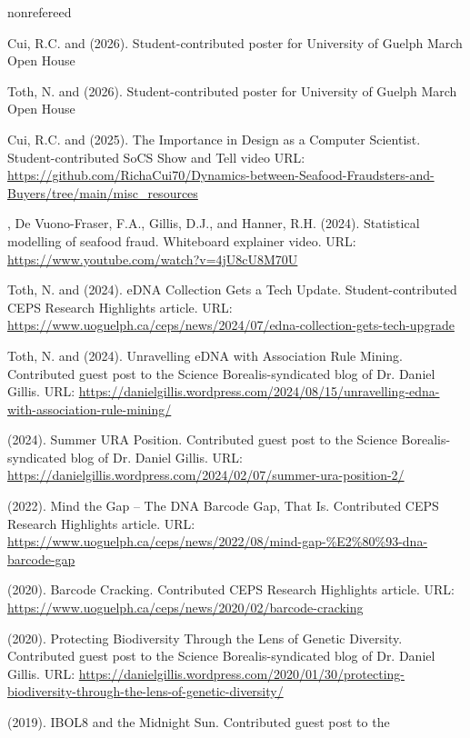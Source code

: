 \medskip
\begin{revlist}[itemsep=0.45\baselineskip]{nonrefereed}
\item \dsup Cui, R.C. and \me (2026). Student-contributed poster for University of
  Guelph March Open House
\item \dsup Toth, N. and \me (2026). Student-contributed poster for University of
  Guelph March Open House
\item \dsup Cui, R.C. and \me (2025). The Importance in Design as a Computer
  Scientist. Student-contributed SoCS Show and Tell video URL:
  \url{https://github.com/RichaCui70/Dynamics-between-Seafood-Fraudsters-and-Buyers/tree/main/misc_resources}
\item \me, \dsup De Vuono-Fraser, F.A., Gillis, D.J., and Hanner, R.H. (2024).
  Statistical modelling of seafood fraud. Whiteboard explainer video. URL:
  \url{https://www.youtube.com/watch?v=4jU8cU8M70U}
\item \dsup Toth, N. and \me (2024). eDNA Collection Gets a Tech Update.
  Student-contributed CEPS Research Highlights article. URL:
  \url{https://www.uoguelph.ca/ceps/news/2024/07/edna-collection-gets-tech-upgrade}
\item \dsup Toth, N. and \me (2024). Unravelling eDNA with Association Rule
  Mining. Contributed guest post to the Science Borealis-syndicated blog of
  Dr. Daniel Gillis. URL:
  \url{https://danielgillis.wordpress.com/2024/08/15/unravelling-edna-with-association-rule-mining/}
\item \me (2024). Summer URA Position. Contributed guest post to the Science
  Borealis-syndicated blog of Dr. Daniel Gillis. URL:
  \url{https://danielgillis.wordpress.com/2024/02/07/summer-ura-position-2/}
\item \me (2022). Mind the Gap -- The DNA Barcode Gap, That Is. Contributed CEPS
  Research Highlights article. URL:
  \url{https://www.uoguelph.ca/ceps/news/2022/08/mind-gap-%E2%80%93-dna-barcode-gap}
\item \me (2020). Barcode Cracking. Contributed CEPS Research Highlights
  article. URL: \url{https://www.uoguelph.ca/ceps/news/2020/02/barcode-cracking}
\item \me (2020). Protecting Biodiversity Through the Lens of Genetic Diversity.
  Contributed guest post to the Science Borealis-syndicated blog of
  Dr. Daniel Gillis. URL:
  \url{https://danielgillis.wordpress.com/2020/01/30/protecting-biodiversity-through-the-lens-of-genetic-diversity/}
\item \me (2019). IBOL8 and the Midnight Sun. Contributed guest post to the

\end{revlist}
